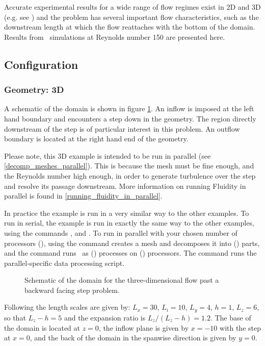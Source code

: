 Accurate experimental results for a wide range of flow regimes exist
in 2D and 3D
(e.g. see \cite{armaly1983}) and the problem has several important flow
characteristics, such as the downstream length at which the flow reattaches
with the bottom of the domain. Results from \fluidity\ simulations at Reynolds number 150
are presented here.


\subsection{Configuration}
\subsubsection{Geometry: 3D}
A schematic of the domain is shown in figure \ref{Fig:Schematic3d}.
An inflow is imposed at the left hand boundary and encounters a step
down in the geometry. The region directly downstream of the step is
of particular interest in this problem. An outflow boundary is located at the
right hand end of the geometry.

Please note, this 3D example is intended to be run in parallel (see \ref{decomp_meshes_parallel}).
This is because the mesh must be fine enough, and the Reynolds number high enough, in order to
generate turbulence over the step and resolve its passage downstream. More information on running
Fluidity in parallel is found in \ref{running_fluidity_in_parallel}.

In practice the example is run in a very similar way to the other examples.
To run in serial, the example is run in exactly the same way to the other examples, using
the commands ,  and .
To run in parallel with your chosen number of processors (), using the command
 creates a mesh and decomposes it into () parts, and
the command  runs \fluidity\ as () processes on () processors.
The command  runs the parallel-specific data processing script.

\begin{figure}
\centering
{}
\caption{Schematic of the domain for the three-dimensional flow past a backward facing step
problem.}
\label{Fig:Schematic3d}
\end{figure}

Following \cite{le1997} the length scales are given by: $L_x=30$, $L_i=10$, $L_y=4$, $h=1$, $L_z=6$,
so that $L_z-h=5$ and the expansion ratio is $L_z/(L_z-h)=1.2$.
The base of the domain is located at $z=0$, the inflow plane is given by $x=-10$ with the step
at $x=0$, and the back of the domain in the spanwise direction is given by $y=0$.

